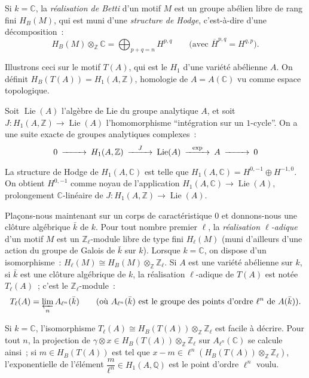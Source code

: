 \documentclass[12pt,a4paper]{article}
\theoremstyle{plain}
\theoremstyle{definition}
\theoremstyle{remark}
\DeclareMathOperator{\Lie}{Lie}
\newcommand{\ZZ}{\mathbb{Z}}
\newcommand{\QQ}{\mathbb{Q}}
\newcommand{\CC}{\mathbb{C}}
\providecommand{\CC}{\mathbb{C}}
\providecommand{\QQ}{\mathbb{Q}}
\providecommand{\ZZ}{\mathbb{Z}}
\providecommand{\Lie}{\operatorname{Lie}}
\begin{document}
Si $k = \CC$, la \emph{réalisation de Betti} d'un motif $M$ est un groupe abélien libre de rang fini $H_B(M)$, qui est muni d'une \emph{structure de Hodge}, c'est-à-dire d'une décomposition~:
\[
H_B(M) \otimes_\ZZ \CC = \bigoplus_{p+q=n} H^{p,q} \qquad \text{(avec } \overline{H}^{p,q} = H^{q,p}\text{)}.
\]

Illustrons ceci sur le motif $T(A)$, qui est le $H_1$ d'une variété abélienne $A$. On définit $H_B(T(A)) = H_1(A, \ZZ)$, homologie de $A = A(\CC)$ vu comme espace topologique.

Soit $\Lie(A)$ l'algèbre de Lie du groupe analytique $A$, et soit $J : H_1(A, \ZZ) \to \Lie(A)$ l'homomorphisme ``intégration sur un $1$-cycle''. On a une suite exacte de groupes analytiques complexes~:
\begin{equation*}
\begin{CD}
0 @>>> H_1(A, \ZZ) @>{J}>> \Lie(A) @>{\exp}>> A @>>> 0
\end{CD}
\end{equation*}

La structure de Hodge de $H_1(A, \CC)$ est telle que $H_1(A, \CC) = H^{0,-1} \oplus H^{-1,0}$. On obtient $H^{0,-1}$ comme noyau de l'application $H_1(A, \CC) \to \Lie(A)$, prolongement $\CC$-linéaire de $J : H_1(A, \ZZ) \to \Lie(A)$.

\bigskip

Plaçons-nous maintenant sur un corps de caractéristique $0$ et donnons-nous une clôture algébrique $\bar{k}$ de $k$. Pour tout nombre premier $\ell$, la \emph{réalisation $\ell$-adique} d'un motif $M$ est un $\ZZ_\ell$-module libre de type fini $H_\ell(M)$ (muni d'ailleurs d'une action du groupe de Galois de $\bar{k}$ sur $k$). Lorsque $k = \CC$, on dispose d'un isomorphisme~: $H_\ell(M) \cong H_B(M) \otimes_\ZZ \ZZ_\ell$. Si $A$ est une variété abélienne sur $k$, si $\bar{k}$ est une clôture algébrique de $k$, la réalisation $\ell$-adique de $T(A)$ est notée $T_\ell(A)$~; c'est le $\ZZ_\ell$-module~:
\[
T_\ell(A) = \varprojlim_n A_{\ell^n}(\bar{k}) \qquad \text{(où } A_{\ell^n}(\bar{k}) \text{ est le groupe des points d'ordre } \ell^n \text{ de } A(\bar{k})\text{)}.
\]

Si $k = \CC$, l'isomorphisme $T_\ell(A) \cong H_B(T(A)) \otimes_\ZZ \ZZ_\ell$ est facile à décrire. Pour tout $n$, la projection de $\gamma \otimes x \in H_B(T(A)) \otimes_\ZZ \ZZ_\ell$ sur $A_{\ell^n}(\CC)$ se calcule ainsi~; si $m \in H_B(T(A))$ est tel que $x - m \in \ell^n (H_B(T(A)) \otimes_\ZZ \ZZ_\ell)$, l'exponentielle de l'élément $\dfrac{m}{\ell^n} \in H_1(A, \QQ)$ est le point d'ordre $\ell^n$ voulu.
\end{document}
